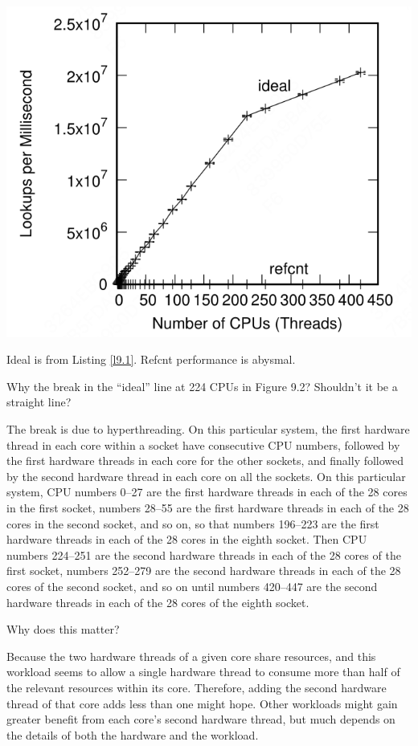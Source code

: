 \documentclass[11pt]{article}
\begin{document}
\begin{center}
\includegraphics[width=.99\textwidth]{../images/perfbook/4.png}
\end{center}

Ideal is from Listing \ref{l9.1}. Refcnt performance is abysmal.
\begin{remark}[]
Why the break in the “ideal” line at 224 CPUs in Figure 9.2? Shouldn’t it be a straight line?

The break is due to hyperthreading. On this particular system, the first hardware thread in each core
within a socket have consecutive CPU numbers, followed by the first hardware threads in each core for
the other sockets, and finally followed by the second hardware thread in each core on all the sockets.
On this particular system, CPU numbers 0–27 are the first hardware threads in each of the 28 cores in
the first socket, numbers 28–55 are the first hardware threads in each of the 28 cores in the second
socket, and so on, so that numbers 196–223 are the first hardware threads in each of the 28 cores in
the eighth socket. Then CPU numbers 224–251 are the second hardware threads in each of the 28 cores of
the first socket, numbers 252–279 are the second hardware threads in each of the 28 cores of the
second socket, and so on until numbers 420–447 are the second hardware threads in each of the 28 cores
of the eighth socket.

Why does this matter?

Because the two hardware threads of a given core share resources, and this workload seems to allow a
single hardware thread to consume more than half of the relevant resources within its core. Therefore,
adding the second hardware thread of that core adds less than one might hope. Other workloads might
gain greater benefit from each core’s second hardware thread, but much depends on the details of both
the hardware and the workload.
\end{remark}
\end{document}

